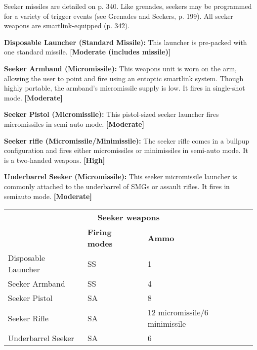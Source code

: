 Seeker missiles are detailed on p. 340. Like grenades, seekers may be programmed for a variety of trigger events (see Grenades and Seekers, p. 199). All seeker weapons are smartlink-equipped (p. 342). 

\textbf{Disposable Launcher (Standard Missile):} This launcher is pre-packed with one standard missile. \textbf{[Moderate (includes missile)]} 

\textbf{Seeker Armband (Micromissile):} This weapons unit is worn on the arm, allowing the user to point and fire using an entoptic smartlink system. Though highly portable, the armband’s micromissile supply is low. It fires in single-shot mode. \textbf{[Moderate]} 

\textbf{Seeker Pistol (Micromissile):} This pistol-sized seeker launcher fires micromissiles in semi-auto mode. \textbf{[Moderate]} 

\textbf{Seeker rifle (Micromissile/Minimissile):} The seeker rifle comes in a bullpup configuration and fires either micromissiles or minimissiles in semi-auto mode. It is a two-handed weapons. \textbf{[High]} 

\textbf{Underbarrel Seeker (Micromissile):} This seeker micromissile launcher is commonly attached to the underbarrel of SMGs or assault rifles. It fires in semiauto mode. \textbf{[Moderate]} 

\begin{table} \begin{tabular}{|l|l|l|} \hline

\multicolumn{3}{|c|}{\textbf{Seeker weapons}} \\ \hline

&\textbf{Firing modes}	&\textbf{Ammo} \\ \hline

Disposable Launcher	&SS	&1 \\ \hline

Seeker Armband	&SS	&4 \\ \hline

Seeker Pistol	&SA	&8 \\ \hline

Seeker Rifle	&SA	&12 micromissile/6 minimissile \\ \hline

Underbarrel Seeker	&SA	&6 \\ \hline

\end{tabular} \label{tab:seeker-weapons} \end{table} 



